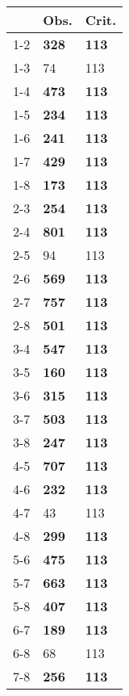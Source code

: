 \begin{table}[ht]
\centering
\begin{tabular}{rll}
  \hline
 & Obs. & Crit. \\ 
  \hline
1-2 & \textbf{328} & \textbf{113} \\ 
  1-3 & 74 & 113 \\ 
  1-4 & \textbf{473} & \textbf{113} \\ 
  1-5 & \textbf{234} & \textbf{113} \\ 
  1-6 & \textbf{241} & \textbf{113} \\ 
  1-7 & \textbf{429} & \textbf{113} \\ 
  1-8 & \textbf{173} & \textbf{113} \\ 
  2-3 & \textbf{254} & \textbf{113} \\ 
  2-4 & \textbf{801} & \textbf{113} \\ 
  2-5 & 94 & 113 \\ 
  2-6 & \textbf{569} & \textbf{113} \\ 
  2-7 & \textbf{757} & \textbf{113} \\ 
  2-8 & \textbf{501} & \textbf{113} \\ 
  3-4 & \textbf{547} & \textbf{113} \\ 
  3-5 & \textbf{160} & \textbf{113} \\ 
  3-6 & \textbf{315} & \textbf{113} \\ 
  3-7 & \textbf{503} & \textbf{113} \\ 
  3-8 & \textbf{247} & \textbf{113} \\ 
  4-5 & \textbf{707} & \textbf{113} \\ 
  4-6 & \textbf{232} & \textbf{113} \\ 
  4-7 & 43 & 113 \\ 
  4-8 & \textbf{299} & \textbf{113} \\ 
  5-6 & \textbf{475} & \textbf{113} \\ 
  5-7 & \textbf{663} & \textbf{113} \\ 
  5-8 & \textbf{407} & \textbf{113} \\ 
  6-7 & \textbf{189} & \textbf{113} \\ 
  6-8 & 68 & 113 \\ 
  7-8 & \textbf{256} & \textbf{113} \\ 
   \hline
\end{tabular}
\end{table}
